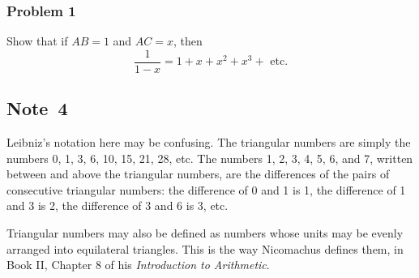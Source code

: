 \documentclass[twoside,openright]{article}
\begin{document}
\subsubsection*{Problem 1}\label{geosum}

Show that if $AB =1$ and $AC = x$, then 
$$\frac{1}{1-x} = 1 + x + x^2 + x^3 + \mbox{ etc.}$$

\subsection*{Note~4}
\label{caa4}

Leibniz's notation here may be confusing.  The triangular numbers are simply the numbers 0, 1, 3, 6, 10, 15, 21, 28, etc.  The numbers 1, 2, 3, 4, 5, 6, and 7, written between and above the triangular numbers, are the differences of the pairs of consecutive triangular numbers: the difference of 0 and 1 is 1, the difference of 1 and 3 is 2, the difference of 3 and 6 is 3, etc.

Triangular numbers may also be defined as numbers whose units may be evenly arranged into equilateral triangles.  This is the way Nicomachus defines them, in Book II, Chapter 8 of his {\em Introduction to Arithmetic}. 
\end{document}
